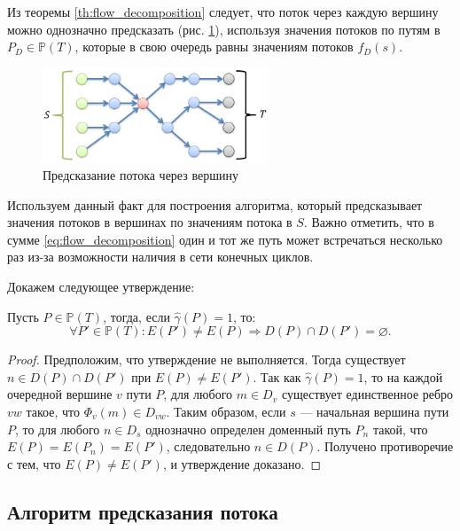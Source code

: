 \documentclass[../thesis.tex]{subfiles}
\begin{document}
Из теоремы \ref{th:flow_decomposition} следует, что поток через каждую вершину можно однозначно предсказать (рис. \ref{fig:decomposition}), используя значения потоков по путям в $P_D\in \mathbb{P}(T)$, которые в свою очередь равны значениям потоков $f_D(s)$.

\begin{figure}
\centering
\includegraphics[width=0.6\textwidth]{figures/decomposition.jpg}
\caption{Предсказание потока через вершину} \label{fig:decomposition}
\end{figure}

Используем данный факт для построения алгоритма, который предсказывает значения потоков в вершинах по значениям потока в $S$.
Важно отметить, что в сумме \eqref{eq:flow_decomposition} один и тот же путь может встречаться несколько раз из-за возможности наличия в сети конечных циклов.

Докажем следующее утверждение:

\begin{proposition}
Пусть $P\in \mathbb{P}(T)$, тогда, если $\hat{\gamma}(P)=1$, то:
\begin{equation}
    \forall P'\in \mathbb{P}(T) : E(P')\neq E(P) \Rightarrow D(P)\cap D(P') = \varnothing.
\end{equation}
\end{proposition}

\begin{proof}
Предположим, что утверждение не выполняется. Тогда существует $n\in D(P)\cap D(P')$ при $E(P)\neq E(P')$.
Так как $\hat{\gamma}(P)=1$, то на каждой очередной вершине $v$ пути $P$, для любого $m\in D_v$ существует единственное ребро $vw$ такое, что $\Phi_v(m)\in D_{vw}$.
Таким образом, если $s$ --- начальная вершина пути $P$, то для любого $n\in D_s$ однозначно определен доменный путь $P_n$ такой, что $E(P)=E(P_n)=E(P')$, следовательно $n\in D(P)$.
Получено противоречие с тем, что $E(P)\neq E(P')$, и утверждение доказано.
\end{proof}

\subsection{Алгоритм предсказания потока}
\end{document}
